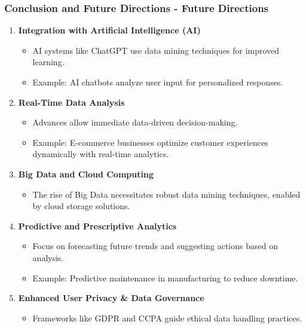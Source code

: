 \documentclass[aspectratio=169]{beamer}
\begin{document}
\begin{frame}[fragile]
    \frametitle{Conclusion and Future Directions - Future Directions}
    
    \begin{enumerate}
        \item \textbf{Integration with Artificial Intelligence (AI)}
            \begin{itemize}
                \item <1-> AI systems like ChatGPT use data mining techniques for improved learning.
                \item <2-> Example: AI chatbots analyze user input for personalized responses.
            \end{itemize}
            
        \item \textbf{Real-Time Data Analysis}
            \begin{itemize}
                \item Advances allow immediate data-driven decision-making.
                \item Example: E-commerce businesses optimize customer experiences dynamically with real-time analytics.
            \end{itemize}
            
        \item \textbf{Big Data and Cloud Computing}
            \begin{itemize}
                \item The rise of Big Data necessitates robust data mining techniques, enabled by cloud storage solutions.
            \end{itemize}
            
        \item \textbf{Predictive and Prescriptive Analytics}
            \begin{itemize}
                \item Focus on forecasting future trends and suggesting actions based on analysis.
                \item Example: Predictive maintenance in manufacturing to reduce downtime.
            \end{itemize}
            
        \item \textbf{Enhanced User Privacy \& Data Governance}
            \begin{itemize}
                \item Frameworks like GDPR and CCPA guide ethical data handling practices.
            \end{itemize}
    \end{enumerate}
\end{frame}
\end{document}

